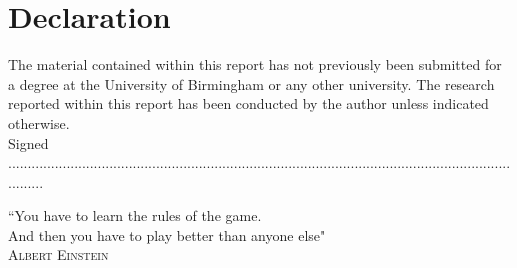 \documentclass[twoside,11pt,a4paper]{article}
\begin{document}
\section*{Declaration}
The material contained within this report has not previously been
submitted for a degree at the University of Birmingham or any other university.
The research reported within this report has been conducted by the author
unless indicated otherwise.\\


Signed ..........................................................................................................................................
\vfill
\clearpage
\begin{center}
\vspace*{\fill}
\begin{minipage}{6in}



\centering \Large{``You have to learn the rules of the game.\\ And then you have to play better than anyone else"}\\{\normalsize{\textsc{Albert Einstein}}}

  \end{minipage}
  \vspace*{\fill}
\end{center}


\clearpage
\maketitle
\vspace{-5.5em} %
\begingroup
    \fontsize{9pt}{11pt}\selectfont
\tableofcontents
\endgroup
\clearpage
{}
\end{document}
